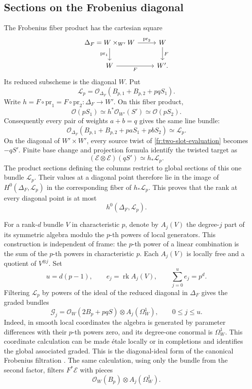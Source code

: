 \documentclass[12pt,a4paper,psamsfonts]{amsart}
\theoremstyle{definition}
\theoremstyle{plain}
\newcommand{\OO}{\mathcal O}
\DeclareMathOperator{\rk}{rk}
\begin{document}
\subsection{Sections on the Frobenius diagonal}
\label{fr:filtration}

The Frobenius fiber product has the cartesian square
\begin{equation}\label{fr:frobenius-square}
\begin{tikzcd}
 \Delta_F=W\times_{W'}W \arrow[r,"\mathrm{pr}_2"] \arrow[d,"\mathrm{pr}_1"'] & W \arrow[d,"F"]\\
 W \arrow[r,"F"'] & W'.
\end{tikzcd}
\end{equation}
Its reduced subscheme is the diagonal $W$.  Put
\[
 \mathcal L_p=
 \OO_{\Delta_F}(B_{p,1}+B_{p,2}+pqS_1).
\]
Write $h=F\circ\mathrm{pr}_1=F\circ\mathrm{pr}_2:
\Delta_F\to W'$. On this fiber product,
\[
 \OO(pS_1)\simeq h^*\OO_{W'}(S')\simeq\OO(pS_2).
\]
Consequently every pair of weights $a+b=q$ gives the same line bundle:
\[
 \OO_{\Delta_F}(B_{p,1}+B_{p,2}+paS_1+pbS_2)
 \simeq\mathcal L_p.
\]
On the diagonal of $W'\times W'$, every source twist of
\eqref{fr:two-slot-evaluation} becomes $-qS'$.
Finite base change and projection formula identify the twisted target as
\[
 (\mathcal E\otimes\mathcal E)(qS')\simeq h_*\mathcal L_p.
\]
The product sections defining the columns restrict to global sections
of this one bundle $\mathcal L_p$. Their values at a diagonal point
therefore lie in the image of $H^0(\Delta_F,\mathcal L_p)$ in the
corresponding fiber of $h_*\mathcal L_p$. This proves that the rank
at every diagonal point is at most
\begin{equation}\label{fr:diagonal-rank-upper}
 h^0(\Delta_F,\mathcal L_p).
\end{equation}

For a rank-$d$ bundle $V$ in characteristic $p$, denote by $A_j(V)$
the degree-$j$ part of its symmetric algebra modulo the $p$-th powers
of local generators.  This construction is independent of frame:
the $p$-th power of a linear combination is the sum of the $p$-th
powers in characteristic $p$.  Each $A_j(V)$ is locally free and a
quotient of $V^{\otimes j}$.  Set
\[
 u=d(p-1),\qquad e_j=\rk A_j(V),\qquad
 \sum_{j=0}^u e_j=p^d.
\]
Filtering $\mathcal L_p$ by powers of the ideal of the reduced
diagonal in $\Delta_F$ gives the graded bundles
\begin{equation}\label{fr:diagonal-graded}
 \mathcal G_j=\OO_W(2B_p+pqS)\otimes A_j(\Omega_W^1),
 \qquad 0\le j\le u.
\end{equation}
Indeed, in smooth local coordinates the algebra is generated by
parameter differences with their $p$-th powers zero, and its
degree-one conormal is $\Omega_W^1$.  This coordinate calculation
can be made étale locally or in completions and identifies the
global associated graded.  This is the diagonal-ideal form of the canonical Frobenius filtration
\cite[Corollary~3.5]{KS}. The same calculation, using
only the bundle from the second factor, filters $F^*\mathcal E$ with pieces
\cite[Theorem~3.7]{Sun}
\begin{equation}\label{fr:Frob-pullback-graded}
 \OO_W(B_p)\otimes A_j(\Omega_W^1).
\end{equation}
\end{document}
